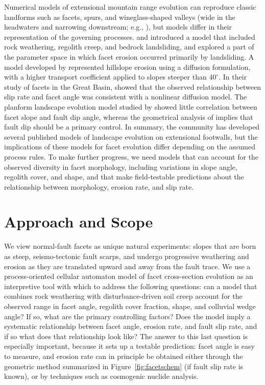 Numerical models of extensional mountain range evolution can reproduce classic landforms such as facets, spurs, and wineglass-shaped valleys (wide in the headwaters and narrowing downstream; e.g., \citet{leeder1993interaction}), but models differ in their representation of the governing processes. \citet{densmore1998landsliding} and \citet{ellis1999development} introduced a model that included rock weathering, regolith creep, and bedrock landsliding, and explored a part of the parameter space in which facet erosion occurred primarily by landsliding. A model developed by \citet{petit2009faceted} represented hillslope erosion using a diffusion formulation, with a higher transport coefficient applied to slopes steeper than $40^\circ$. In their study of facets in the Great Basin, \citet{depolo2000estimating} showed that the observed relationship between slip rate and facet angle was consistent with a nonlinear diffusion model.  %
The planform landscape evolution model studied by \citet{petit2009faceted} showed little correlation between facet slope and fault dip angle, whereas the geometrical analysis of \citet{tucker2011geomorphic} implies that fault dip should be a primary control. In summary, the community has developed several published models of landscape evolution on extensional footwalls, but the implications of these models for facet evolution differ depending on the assumed process rules. To make further progress, we need models that can account for the observed diversity in facet morphology, including variations in slope angle, regolith cover, and shape, and that make field-testable predictions about the relationship between morphology, erosion rate, and slip rate.


\section{Approach and Scope}

We view normal-fault facets as unique natural experiments: slopes that are born as steep, seismo-tectonic fault scarps, and undergo progressive weathering and erosion as they are translated upward and away from the fault trace. We use a process-oriented cellular automaton model of facet cross-section evolution as an interpretive tool with which to address the following questions: can a model that combines rock weathering with disturbance-driven soil creep account for the observed range in facet angle, regolith cover fraction, shape, and colluvial wedge angle? If so, what are the primary controlling factors? Does the model imply a systematic relationship between facet angle, erosion rate, and fault slip rate, and if so what does that relationship look like? The answer to this last question is especially important, because it sets up a testable prediction: facet angle is easy to measure, and erosion rate can in principle be obtained either through the geometric method summarized in Figure~\ref{fig:facetschem} (if fault slip rate is known), or by techniques such as cosmogenic nuclide analysis.

